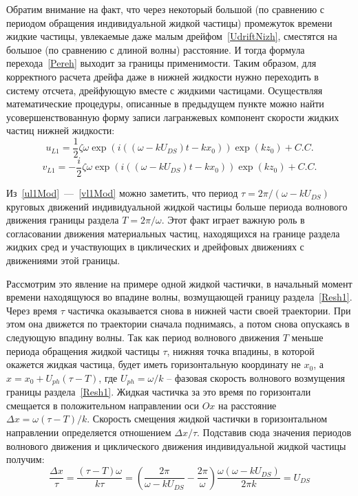 Обратим внимание на факт, что через некоторый большой (по сравнению с периодом обращения индивидуальной жидкой частицы) промежуток времени жидкие частицы, увлекаемые даже малым дрейфом~\eqref{UdriftNizh}, сместятся на большое (по сравнению с длиной волны) расстояние. И тогда формула перехода~\eqref{Pereh} выходит за границы применимости. Таким образом, для корректного расчета дрейфа даже в нижней жидкости нужно переходить в систему отсчета, дрейфующую вместе с жидкими частицами. Осуществляя математические процедуры, описанные в предыдущем пункте можно найти усовершенствованную форму записи лагранжевых компонент скорости жидких частиц нижней жидкости:
\begin{equation}
u_{L1}=\dfrac{1}{2}\zeta \omega \exp \left( i\left( \left( \omega - k U_{DS} \right) t- k x_{0}\right) \right) \exp \left( k z_{0} \right) +C.C.
\label{ul1Mod}
\end{equation}
\begin{equation}
v_{L1}=-\dfrac{i}{2}\zeta \omega \exp \left( i\left( \left( \omega - k U_{DS} \right) t- k x_{0}\right) \right) \exp \left( k z_{0} \right) +C.C.
\label{vl1Mod}
\end{equation}

Из~\eqref{ul1Mod}~---~\eqref{vl1Mod} можно заметить, что период $ \tau=2\pi / \left( \omega - k U_{DS} \right) $ круговых движений индивидуальной жидкой частицы больше периода волнового движения границы раздела $ T=2\pi / \omega $. Этот факт играет важную роль в согласовании движения материальных частиц, находящихся на границе раздела жидких сред и участвующих в циклических и дрейфовых движениях с движениями этой границы. 

Рассмотрим это явление на примере одной жидкой частички, в начальный момент времени находящуюся во впадине волны, возмущающей границу раздела~\eqref{Resh1}. Через время $ \tau $ частичка оказывается снова в нижней части своей траектории. При этом она движется по траектории сначала поднимаясь, а потом снова опускаясь в следующую впадину волны. Так как период волнового движения $ T $ меньше периода обращения жидкой частицы $ \tau $, нижняя точка впадины, в которой окажется жидкая частица, будет иметь горизонтальную координату не $ x_{0} $, а $ x=x_{0}+U_{ph}\left( \tau -T\right) $, где $ U_{ph}=\omega/k $ – фазовая скорость волнового возмущения границы раздела~\eqref{Resh1}. Жидкая частичка за это время по горизонтали смещается в положительном направлении оси $ Ox $ на расстояние $ \Delta x = \omega \left( \tau -T\right)/k $. Скорость смещения жидкой частички в горизонтальном направлении определяется отношением $ \Delta x/\tau $. Подставив сюда значения периодов волнового движения и циклического движения индивидуальной жидкой частицы получим:
\begin{equation*}
\dfrac{\Delta x}{\tau}=\dfrac{\left( \tau -T\right) \omega}{k \tau}=\left( \dfrac{2 \pi}{\omega - k U_{DS} } - \dfrac{2 \pi}{\omega}\right)\dfrac{\omega \left( \omega - k U_{DS}\right)}{2 \pi k}=U_{DS}
\end{equation*}

